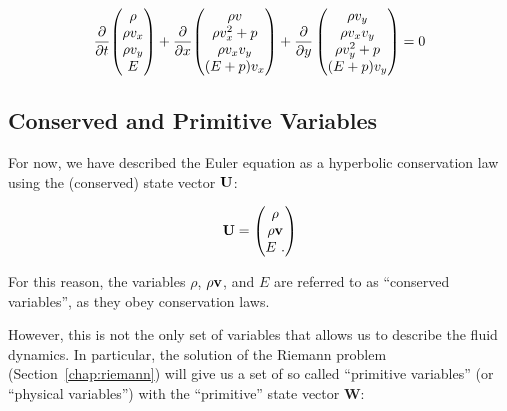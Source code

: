 \begin{align}
	\frac{\partial}{\partial t}{ 
		\begin{pmatrix}
			\rho \\ \rho v_x \\ \rho v_y \\ E
		\end{pmatrix}
		}
	+ \frac{\partial}{\partial x} {
		\begin{pmatrix}
			\rho v\\
			\rho v_x^2  + p\\
			\rho v_x v_y\\
			(E + p) v_x
		\end{pmatrix}
	} 
	+ \frac{\partial}{\partial y}
		\begin{pmatrix}
			\rho v_y\\
			\rho v_x v_y\\
			\rho v_y^2  + p\\
			(E + p) v_y
		\end{pmatrix}
	= 0
\end{align}















\subsection{Conserved and Primitive Variables}


For now, we have described the Euler equation as a hyperbolic conservation law
using the (conserved) state vector $\mathbf{U}$:

\begin{align}
	\mathbf{U} = 
		\begin{pmatrix}
			\rho \\ \rho \mathbf{v} \\ E \ .
		\end{pmatrix}
\end{align}


For this reason, the variables $\rho$, $\rho \mathbf{v}$, and $E$ are referred to as
``conserved variables'', as they obey conservation laws.

However, this is not the only set of variables that allows us to describe the
fluid dynamics. In particular, the solution of the  Riemann problem
(Section~\ref{chap:riemann}) will give us a set of so called ``primitive
variables'' (or ``physical variables'') with the ``primitive'' state vector
$\mathbf{W}$:

